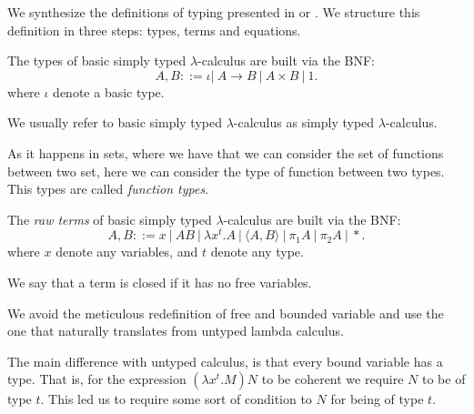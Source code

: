  We synthesize the definitions of typing presented in \cite{lambek1988introduction} or \cite{selinger2008lecture}. We structure this definition in three steps: types, terms  and equations.


\begin{definition}
  The types of basic simply typed $\lambda$-calculus are built via the BNF:
  $$A,B ::= \iota |\ A\to B\ |\ A \times B  \ |\ 1.$$
  where $\iota$ denote a basic type. 
\end{definition}
\begin{remark}
We usually refer to basic simply typed $\lambda$-calculus as simply typed $\lambda$-calculus.
\end{remark}




As it happens in sets, where we have that we can consider the set of functions between two set, here we can consider the type of function between two types. This types are called \emph{function types}.\\




\begin{definition}
  The \emph{raw terms} of basic simply typed $\lambda$-calculus are built via the BNF:
  $$A,B ::= x\ |\ AB\ |\ \lambda x^t.A \ |\ \langle A,B \rangle\ |\ \pi_1A\ |\ \pi_2A\ |\ *.$$
  where $x$ denote any variables, and $t$ denote any type. 
\end{definition}
\begin{definition}
  We say that a term is closed if it has no free variables.
\end{definition}
\begin{remark}
  We avoid the meticulous redefinition of free and bounded variable and use the one that naturally translates from untyped lambda calculus.
\end{remark}


The main difference with untyped calculus, is that every bound variable has a type. That is, for the expression $(\lambda x^t.M)N$ to be coherent we require $N$ to be of type $t$. This led us to require some sort of condition to $N$ for being of type $t$.\\


